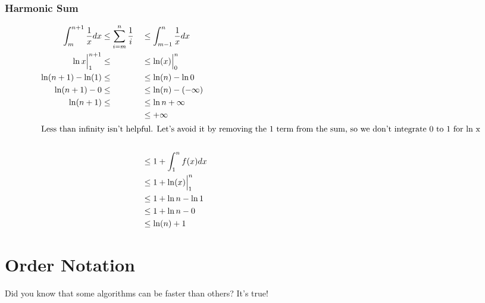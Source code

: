 \documentclass[english, 10pt]{article}
\begin{document}
\subsubsection{Harmonic Sum}
\begin{alignat*}{3}
    \int_{m}^{n+1} \frac{1}{x} dx &\le \sum_{i=m}^{n} \frac{1}{i} &&\le \int_{m-1}^{n} \frac{1}{x} dx \\
    \ln x \Big|_1^{n+1}           &\le                        &&\le \ln(x) \Big|_0^n \\
    \ln (n+1) -\ln(1)             &\le                        &&\le \ln(n) -\ln 0 \\
    \ln (n+1) - 0                 &\le                        &&\le \ln(n) - (-\infty) \\
    \ln (n+1)                     &\le                        &&\le \ln n +\infty \\
                                  &                           &&\le +\infty\\
    \intertext{Less than infinity isn't helpful. Let's avoid it by removing the 1 term from the sum, so we don't integrate 0 to 1 for ln x} \\
    &  &  & \le 1+ \int_{1}^{n} f(x) dx \\
    &  &  & \le 1+ \ln(x) \Big|_1^n \\
    &  &  & \le 1+ \ln n - \ln 1 \\
    &  &  & \le 1+ \ln n -0 \\
    &  &  & \le \ln(n) + 1 \\
\end{alignat*}


\section{Order Notation}
Did you know that some algorithms can be faster than others? It's true!
\end{document}
